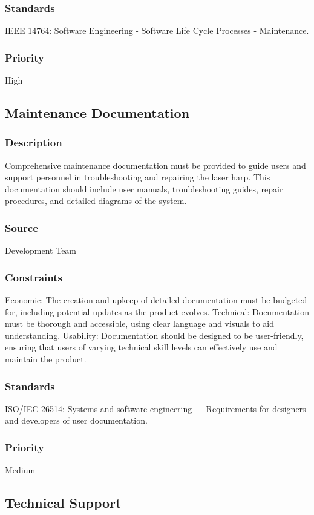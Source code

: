 \subsubsection{Standards}
IEEE 14764: Software Engineering - Software Life Cycle Processes - Maintenance.
\subsubsection{Priority}
High


\subsection{Maintenance Documentation}
\subsubsection{Description}
Comprehensive maintenance documentation must be provided to guide users and support personnel in troubleshooting and repairing the laser harp. This documentation should include user manuals, troubleshooting guides, repair procedures, and detailed diagrams of the system.
\subsubsection{Source}
Development Team
\subsubsection{Constraints}
Economic: The creation and upkeep of detailed documentation must be budgeted for, including potential updates as the product evolves.
Technical: Documentation must be thorough and accessible, using clear language and visuals to aid understanding.
Usability: Documentation should be designed to be user-friendly, ensuring that users of varying technical skill levels can effectively use and maintain the product.
\subsubsection{Standards}
ISO/IEC 26514: Systems and software engineering — Requirements for designers and developers of user documentation.
\subsubsection{Priority}
Medium


\subsection{Technical Support}
